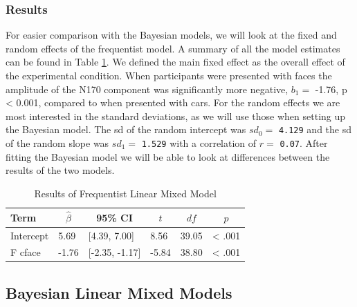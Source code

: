 \documentclass[
  doc,12pt,floatsintext]{apa7}
\begin{document}
\subsubsection{Results}\label{results}

For easier comparison with the Bayesian models, we will look at the fixed and random effects of the frequentist model. A summary of all the model estimates can be found in Table \ref{tab:fLMM-table}. We defined the main fixed effect as the overall effect of the experimental condition. When participants were presented with faces the amplitude of the N170 component was significantly more negative, \(b_1 =\) -1.76, p \textless{} 0.001, compared to when presented with cars. For the random effects we are most interested in the standard deviations, as we will use those when setting up the Bayesian model. The sd of the random intercept was \(sd_0 =\) \texttt{4.129} and the sd of the random slope was \(sd_1 =\) \texttt{1.529} with a correlation of \(r =\) \texttt{0.07}. After fitting the Bayesian model we will be able to look at differences between the results of the two models.

\begin{table}[tbp]

\begin{center}
\begin{threeparttable}

\caption{\label{tab:fLMM-table}Results of Frequentist Linear Mixed Model}

\begin{tabular}{llllll}
\toprule
Term & \multicolumn{1}{c}{$\hat{\beta}$} & \multicolumn{1}{c}{95\% CI} & \multicolumn{1}{c}{$t$} & \multicolumn{1}{c}{$\mathit{df}$} & \multicolumn{1}{c}{$p$}\\
\midrule
Intercept & 5.69 & {}[4.39, 7.00] & 8.56 & 39.05 & < .001\\
F cface & -1.76 & {}[-2.35, -1.17] & -5.84 & 38.80 & < .001\\
\bottomrule
\end{tabular}

\end{threeparttable}
\end{center}

\end{table}

\subsection{Bayesian Linear Mixed Models}\label{bayesian-linear-mixed-models}
\end{document}
